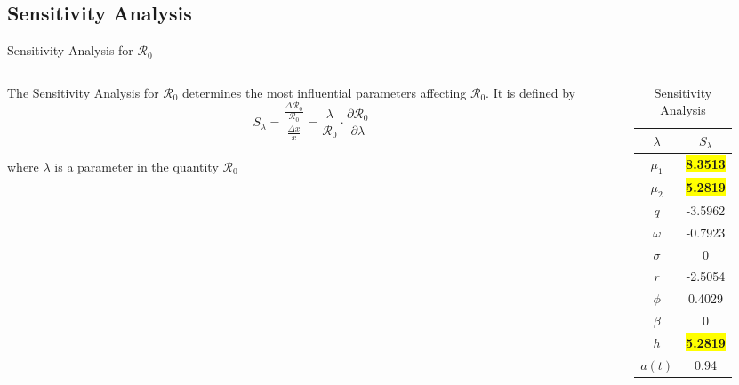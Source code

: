 \documentclass{beamer}
\begin{document}
\subsection{Sensitivity Analysis}
\begin{frame}{Sensitivity Analysis for $\mathscr{R}_0$}
    \begin{columns}
        \begin{column}{0.6\textwidth}
        \small
            The Sensitivity Analysis for $\mathscr{R}_0$ determines the most influential parameters affecting $\mathscr{R}_0$. It is defined by
                $$S_{\lambda} = \frac{\frac{\Delta \mathscr{R}_{0}}{\mathscr{R}_{0}}}{\frac{\Delta x}{x}} = \frac{\lambda}{\mathscr{R}_{0}} \cdot \frac{\partial \mathscr{R}_{0}}{\partial \lambda}$$ \\
                where $\lambda$ is a parameter in the quantity $\mathscr{R}_{0}$
        \end{column}
        \begin{column}{0.4\textwidth}
            \begin{table}[H]
                \centering
                \begin{tabular}{|c|c|}
                \hline
                    $\lambda$ & $S_{\lambda}$ \\
                    \hline
                    \hline
                    $\mu_{1}$ & \colorbox{yellow}{\textbf{8.3513}}\\
                    \hline
                    $\mu_{2}$ & \colorbox{yellow}{\textbf{5.2819}}\\
                    \hline
                    $q$ & -3.5962\\
                    \hline
                    $\omega$ & -0.7923\\
                    \hline
                    $\sigma$ & 0\\
                    \hline
                    $r$ & -2.5054\\
                    \hline
                    $\phi$ & 0.4029\\
                    \hline
                    $\beta$ & 0\\
                    \hline
                    $h$ & \colorbox{yellow}{\textbf{5.2819}}\\
                    \hline
                    $a(t)$ & 0.94\\
                    \hline
                \end{tabular}
                \caption{Sensitivity Analysis}
                \label{tab:sens_analysis}
            \end{table}
        \end{column}
    \end{columns}
    
    
\end{frame}
\end{document}

